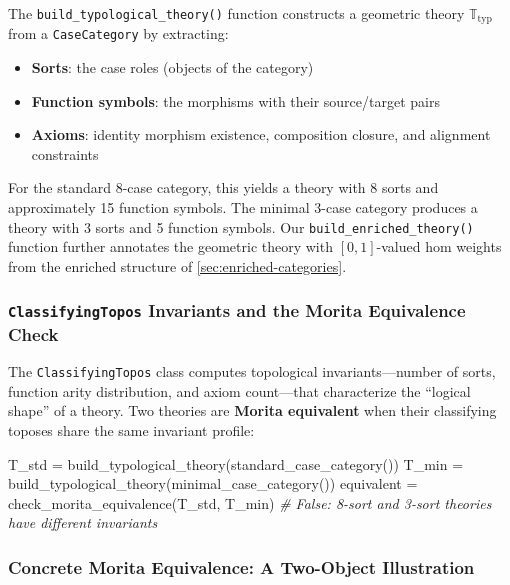 \documentclass[
]{article}
\newenvironment{Shaded}{}{}
\newcommand{\CommentTok}[1]{\textcolor[rgb]{0.38,0.63,0.69}{\textit{#1}}}
\newcommand{\NormalTok}[1]{#1}
\newcommand{\OperatorTok}[1]{\textcolor[rgb]{0.40,0.40,0.40}{#1}}
\providecommand{\tightlist}{%
  \setlength{\itemsep}{0pt}\setlength{\parskip}{0pt}}
\begin{document}
The \texttt{build\_typological\_theory()} function constructs a
geometric theory \(\mathbb{T}_{\text{typ}}\) from a
\texttt{CaseCategory} by extracting:

\begin{itemize}
\tightlist
\item
  \textbf{Sorts}: the case roles (objects of the category)
\item
  \textbf{Function symbols}: the morphisms with their source/target
  pairs
\item
  \textbf{Axioms}: identity morphism existence, composition closure, and
  alignment constraints
\end{itemize}

For the standard 8-case category, this yields a theory with 8 sorts and
approximately 15 function symbols. The minimal 3-case category produces
a theory with 3 sorts and 5 function symbols. Our
\texttt{build\_enriched\_theory()} function further annotates the
geometric theory with \([0,1]\)-valued hom weights from the enriched
structure of \autoref{sec:enriched-categories}.

\subsubsection{\texorpdfstring{\texttt{ClassifyingTopos} Invariants and
the Morita Equivalence
Check}{ClassifyingTopos Invariants and the Morita Equivalence Check}}\label{classifyingtopos-invariants-and-the-morita-equivalence-check}

The \texttt{ClassifyingTopos} class computes topological
invariants---number of sorts, function arity distribution, and axiom
count---that characterize the ``logical shape'' of a theory. Two
theories are \textbf{Morita equivalent} when their classifying toposes
share the same invariant profile:

\begin{Shaded}
\begin{Highlighting}[]
\NormalTok{T\_std }\OperatorTok{=}\NormalTok{ build\_typological\_theory(standard\_case\_category())}
\NormalTok{T\_min }\OperatorTok{=}\NormalTok{ build\_typological\_theory(minimal\_case\_category())}
\NormalTok{equivalent }\OperatorTok{=}\NormalTok{ check\_morita\_equivalence(T\_std, T\_min)}
\CommentTok{\# False: 8{-}sort and 3{-}sort theories have different invariants}
\end{Highlighting}
\end{Shaded}

\subsubsection{Concrete Morita Equivalence: A Two-Object
Illustration}\label{sec:morita-two-object}
\end{document}
